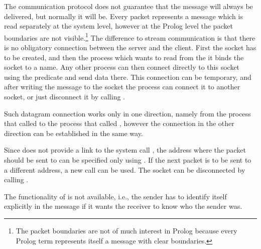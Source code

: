 The communication protocol does not guarantee that the message
will always be delivered, but normally it will be.
Every packet represents a message which is read separately
at the system level, however at the Prolog level the packet
boundaries are not visible.\footnote{%
  The packet boundaries are not of much
  interest in Prolog because every Prolog term represents itself
  a message with clear boundaries.}
The difference to stream communication is that
there is no obligatory connection between the server and the client.
First the socket has to be created, and then the process which wants
to read from the it binds the socket to a name.
Any other process can then connect directly to this socket
using the  predicate
and send data there.
This connection can be temporary, and after writing the message
to the socket the process can connect it to another socket,
or just disconnect it by calling .

Such datagram connection works only in one direction, namely
from the process that called
 to the process that
called
, however the connection in
the other direction
can be established in the same way.

Since {\eclipse} does not provide a link to the system call ,
the address where the packet should be sent
to can be specified only using
.
If the next packet is to be sent to a different address, a new
call can be used.
The socket can be disconnected by calling .

The functionality of  is not available, i.e.,
the sender has to identify itself explicitly in the message
if it wants the receiver to know who the sender was.

